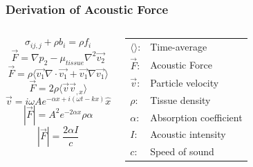 \documentclass{beamer}
\begin{document}
		\begin{frame}[label=arfiForceDerivation]
			\frametitle{Derivation of Acoustic Force}
			\begin{columns}[c]
					\begin{equation*}
						\label{equ:arfi_linear_momentum}
						\sigma_{ij,j} + \rho b_i = \rho f_i
					\end{equation*}
					\begin{equation*}
						\label{equ:radiation_force_1a}
						\vec{F} = \nabla p_2 - \mu_{tissue} \nabla^2 \vec{v_2}
					\end{equation*}
					\begin{equation*}
						\label{equ:radiation_force_1b}
						\vec{F} = \rho \langle\vec{v_1}\nabla\cdot\vec{v_1} + \vec{v_1}\nabla\vec{v_1}\rangle 
					\end{equation*}
					\begin{equation*}
						\label{equ:radiation_force_2}
						\vec{F} = 2\rho\langle \vec{v} \vec{v}_{,x} \rangle
					\end{equation*}
					\begin{equation*}
						\label{equ:particle_velocity}
						\vec{v} = i\omega A e^{-\alpha x + i\left(\omega t - k x\right)}\hat{x}
					\end{equation*}
					\begin{equation*}
						\label{equ:radiation_force_3}
						\left|\vec{F}\right| = A^2 e^{-2\alpha x}\rho\alpha
					\end{equation*}
					\begin{equation*}
						\label{equ:radiation_force}
						\boxed{\left|\vec{F}\right| = \frac{2\alpha I}{c}}
					\end{equation*}

					\begin{center}
						\begin{tabular}{ll}
							$\langle\rangle$: & Time-average \\
							$\vec{F}$: & Acoustic Force \\
							$\vec{v}$: & Particle velocity \\
							$\rho$: & Tissue density \\
							$\alpha$: & Absorption coefficient \\
							$I$: & Acoustic intensity \\
							$c$: & Speed of sound \\
						\end{tabular}
					\end{center}
			\end{columns}
		\end{frame}
\end{document}
